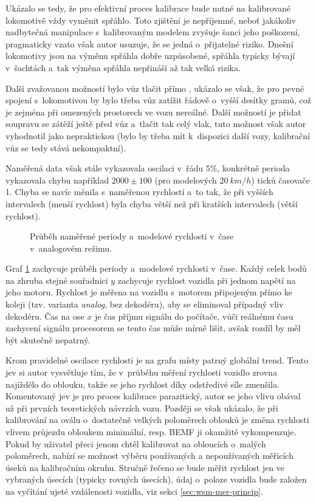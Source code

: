 Ukázalo se tedy, že pro efektivní proces kalibrace bude nutné na kalibrované
lokomotivě vždy vyměnit spřáhlo. Toto zjištění je nepříjemné, neboť
jakákoliv nadbytečná manipulace s~kalibrovaným modelem zvyšuje šanci jeho
poškození, pragmaticky vzato však autor usuzuje, že se jedná o~přijatelné
riziko. Dnešní lokomotivy jsou na výměnu spřáhla dobře uzpůsobené, spřáhla
typicky bývají v~šachtách a~tak výměna spřáhla nepřináší až tak velká rizika.

Další zvažovanou možností bylo vůz tlačit přímo ,
ukázalo se však, že pro pevné spojení s~lokomotivou by bylo třeba vůz zatížit
řádově o~vyšší desítky gramů, což je zejména při omezených prostorech ve vozu
nereálné. Další možností je přidat soupravu se zátěží ještě před vůz a~tlačit
tak celý vlak, tuto možnost však autor vyhodnotil jako nepraktickou (bylo by
třeba mít k~dispozici další vozy, kalibrační vůz se tedy stává nekompaktní).

Naměřená data však stále vykazovala oscilaci v~řádu $5 \%$, konkrétně perioda
vykazovala chybu například $2000 \pm 100$ (pro modelových $20\ km/h$) ticků
časovače 1. Chyba se navíc měnila s~naměřenou rychlostí a~to tak, že při
vyšších intervalech (menší rychlost) byla chyba větší než při kratších
intervalech (větší rychlost).

\begin{figure}[h]

\caption{Průběh naměřené periody a~modelové rychlosti v~čase v~analogovém
režimu.}
\label{fig:speed-analog}
\end{figure}

Graf \ref{fig:speed-analog} zachycuje průběh periody a~modelové rychlosti
v~čase. Každý celek bodů na zhruba stejné souřadnici $y$ zachycuje rychlost
vozidla při jednom napětí na jeho motoru. Rychlost je měřena na vozidlu
s~motorem připojeným přímo ke koleji (tzv. varianta \textit{analog}, bez
dekodéru), aby se eliminoval případný vliv dekodéru. Čas na ose $x$ je čas
příjmu signálu do počítače, vůči reálnému času zachycení signálu procesorem se
tento čas může mírně lišit, avšak rozdíl by měl být skutečně nepatrný.

Krom pravidelné oscilace rychlosti je na grafu místy patrný globální
 trend. Tento jev si autor vysvětluje tím, že v~průběhu měření
rychlosti vozidlo zrovna najíždělo do oblouku, takže se jeho rychlost díky
odstředivé síle zmenšila. Komentovaný jev je pro proces kalibrace parazitický,
autor se jeho vlivu obával už při prvních teoretických návrzích vozu. Později
se však ukázalo, že při kalibrování na oválu o~dostatečně velkých poloměrech
oblouků je změna rychlosti vlivem průjezdu obloukem minimální, resp. BEMF ji
okamžitě vykompenzuje. Pokud by uživatel přeci jenom chtěl kalibrovat na
obloucích o~malých poloměrech, nabízí se možnost výběru používaných a
nepoužívaných měřicích úseků na kalibračním okruhu. Stručně řečeno se bude
měřit rychlost jen ve vybraných úsecích (typicky rovných úsecích), údaj
o~poloze vozidla bude založen na vyčítání ujeté vzdálenosti vozidla, viz sekci
\ref{sec:wsm-mer-princip}.

